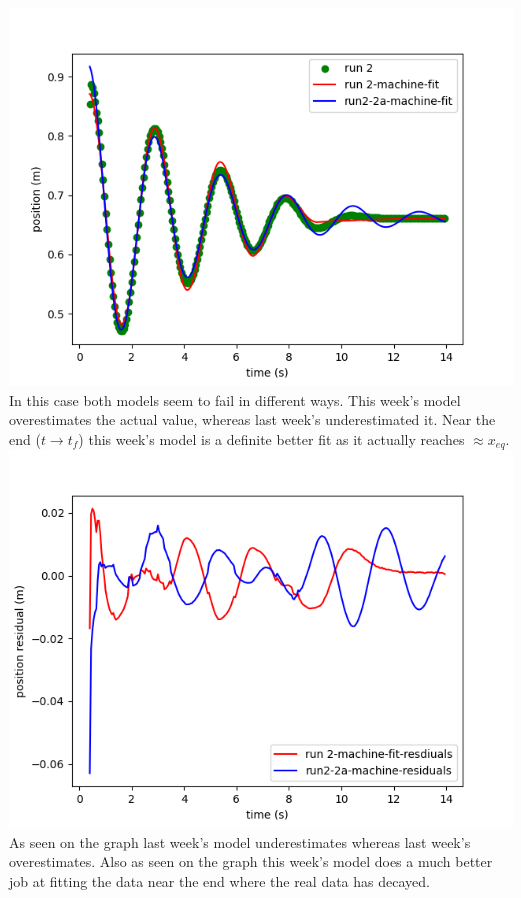 \documentclass[10pt]{article}
\theoremstyle{definition}
\begin{document}
\includegraphics{Figure_1.png}\\
In this case both models seem to fail in different ways. This week's model overestimates the actual value, whereas last week's underestimated it.
Near the end ($t\to t_f$) this week's model is a definite better fit as it actually reaches $\approx x_{eq}$. \\
\includegraphics{Figure_100-R2R.png}\\
As seen on the graph last week's model underestimates whereas last week's overestimates. Also as seen on the graph this week's 
model does a much better job at fitting the data near the end where the real data has decayed.
\newpage
\end{document}
